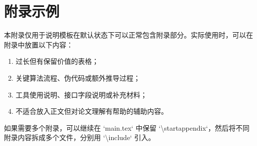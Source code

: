 \chapter{附录示例}

\gdtbodytext

本附录仅用于说明模板在默认状态下可以正常包含附录部分。实际使用时，可以在附录中放置以下内容：

\begin{enumerate}
\item 过长但有保留价值的表格；
\item 关键算法流程、伪代码或额外推导过程；
\item 工具使用说明、接口字段说明或补充材料；
\item 不适合放入正文但对论文理解有帮助的辅助内容。
\end{enumerate}

如果需要多个附录，可以继续在 `main.tex` 中保留 `\textbackslash startappendix`，然后将不同附录内容拆成多个文件，分别用 `\textbackslash include` 引入。
